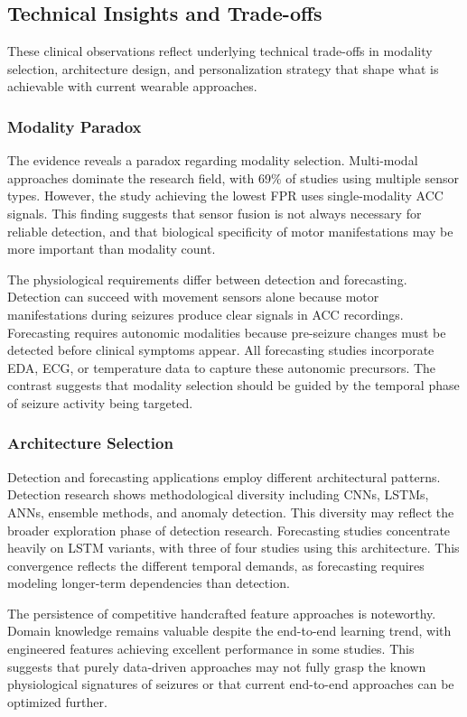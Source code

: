 \subsection{Technical Insights and Trade-offs}

These clinical observations reflect underlying technical trade-offs in modality selection, architecture design, and personalization strategy that shape what is achievable with current wearable approaches.

\subsubsection{Modality Paradox}

The evidence reveals a paradox regarding modality selection. Multi-modal approaches dominate the research field, with 69\% of studies using multiple sensor types. However, the study achieving the lowest FPR uses single-modality ACC signals. This finding suggests that sensor fusion is not always necessary for reliable detection, and that biological specificity of motor manifestations may be more important than modality count.

The physiological requirements differ between detection and forecasting. Detection can succeed with movement sensors alone because motor manifestations during seizures produce clear signals in ACC recordings. 
Forecasting requires autonomic modalities because pre-seizure changes must be detected before clinical symptoms appear. All forecasting studies incorporate EDA, ECG, or temperature data to capture these autonomic precursors. The contrast suggests that modality selection should be guided by the temporal phase of seizure activity being targeted.

\subsubsection{Architecture Selection}

Detection and forecasting applications employ different architectural patterns. Detection research shows methodological diversity including CNNs, LSTMs, ANNs, ensemble methods, and anomaly detection. This diversity may reflect the broader exploration phase of detection research. Forecasting studies concentrate heavily on LSTM variants, with three of four studies using this architecture. This convergence reflects the different temporal demands, as forecasting requires modeling longer-term dependencies than detection.

The persistence of competitive handcrafted feature approaches is noteworthy. Domain knowledge remains valuable despite the end-to-end learning trend, with engineered features achieving excellent performance in some studies. This suggests that purely data-driven approaches may not fully grasp the known physiological signatures of seizures or that current end-to-end approaches can be optimized further.

